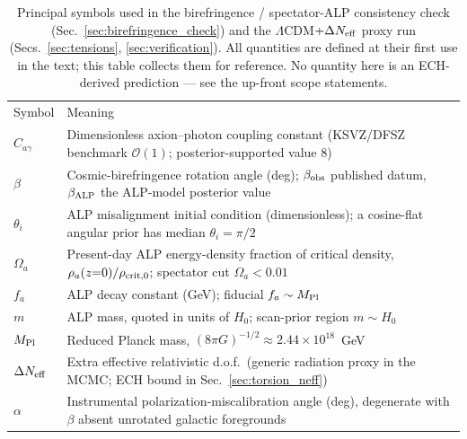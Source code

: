 \documentclass[aps,prd,twocolumn,superscriptaddress,showpacs,preprintnumbers,nofootinbib,longbibliography,floatfix]{revtex4-2}
\newcommand{\MPl}{M_{\rm Pl}}
\newcommand{\Neff}{N_{\rm eff}}
\begin{document}
\begin{table}[t]
\caption{Principal symbols used in the birefringence / spectator-ALP
consistency check (Sec.~\ref{sec:birefringence_check}) and the
$\Lambda$CDM$+\Delta\Neff$ proxy run (Secs.~\ref{sec:tensions},
\ref{sec:verification}). All quantities are defined at their first use in the
text; this table collects them for reference. No quantity here is an
ECH-derived prediction --- see the up-front scope statements.}
\label{tab:notation}
\begin{ruledtabular}
\begin{tabular}{ll}
Symbol & Meaning \\
\colrule
$C_{a\gamma}$ & Dimensionless axion--photon coupling constant (KSVZ/DFSZ benchmark $\mathcal{O}(1)$; posterior-supported value $8$) \\
$\beta$ & Cosmic-birefringence rotation angle (deg); $\beta_{\rm obs}$ published datum, $\beta_{\rm ALP}$ the ALP-model posterior value \\
$\theta_i$ & ALP misalignment initial condition (dimensionless); a cosine-flat angular prior has median $\theta_i=\pi/2$ \\
$\Omega_a$ & Present-day ALP energy-density fraction of critical density, $\rho_a(z{=}0)/\rho_{\rm crit,0}$; spectator cut $\Omega_a<0.01$ \\
$f_a$ & ALP decay constant (GeV); fiducial $f_a\sim\MPl$ \\
$m$ & ALP mass, quoted in units of $H_0$; scan-prior region $m\sim H_0$ \\
$\MPl$ & Reduced Planck mass, $(8\pi G)^{-1/2}\approx2.44\times10^{18}$~GeV \\
$\Delta\Neff$ & Extra effective relativistic d.o.f.\ (generic radiation proxy in the MCMC; ECH bound in Sec.~\ref{sec:torsion_neff}) \\
$\alpha$ & Instrumental polarization-miscalibration angle (deg), degenerate with $\beta$ absent unrotated galactic foregrounds \\
\end{tabular}
\end{ruledtabular}
\end{table}


\end{document}
